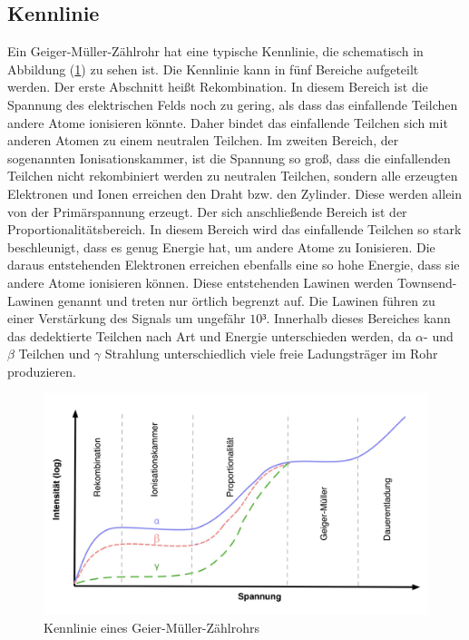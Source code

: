 \subsection{Kennlinie}
Ein Geiger-Müller-Zählrohr hat eine typische Kennlinie, die schematisch in Abbildung 
(\ref{fig:Kennlinie}) zu sehen ist. Die Kennlinie kann in fünf Bereiche aufgeteilt werden. 
Der erste Abschnitt heißt Rekombination. In diesem Bereich ist die Spannung des elektrischen 
Felds noch zu gering, als dass das einfallende Teilchen andere Atome ionisieren könnte. 
Daher bindet das einfallende Teilchen sich mit anderen Atomen zu einem neutralen Teilchen. 
Im zweiten Bereich, der sogenannten Ionisationskammer, ist die Spannung so groß, 
dass die einfallenden Teilchen nicht rekombiniert werden zu neutralen Teilchen, sondern
alle erzeugten Elektronen und Ionen erreichen den Draht bzw. den Zylinder. Diese werden 
allein von der Primärspannung erzeugt. Der sich anschließende Bereich ist der 
Proportionalitätsbereich. In diesem Bereich wird das einfallende Teilchen so stark 
beschleunigt, dass es genug Energie hat, um andere Atome zu Ionisieren. Die daraus 
entstehenden Elektronen erreichen ebenfalls eine so hohe Energie, dass sie 
andere Atome ionisieren können. Diese entstehenden Lawinen werden Townsend-Lawinen genannt 
und treten nur örtlich begrenzt auf. Die Lawinen führen zu einer Verstärkung des 
Signals um ungefähr $10³$. Innerhalb dieses Bereiches kann das dedektierte Teilchen 
nach Art und Energie unterschieden werden, da $\alpha$- und $\beta$ Teilchen und $\gamma$ 
Strahlung unterschiedlich viele freie Ladungsträger im Rohr produzieren.  
\begin{figure}[H]
    \centering
    \includegraphics[width=\textwidth]{content/Bilder/Kennlinie.jpeg}
    \caption{Kennlinie eines Geier-Müller-Zählrohrs \cite{anleitungV703}}
    \label{fig:Kennlinie}
\end{figure}
